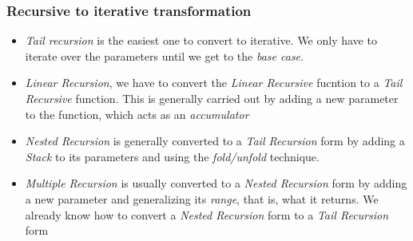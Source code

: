 \documentclass{beamer}
\begin{document}
\begin{frame}
	\frametitle{Recursive to iterative transformation}
	\begin{itemize}
		\item \textit{Tail recursion} is the easiest one to convert to iterative. We only have to iterate over the parameters until we get to the \textit{base case}.
		\item \textit{Linear Recursion}, we have to convert the \textit{Linear Recursive} fucntion to a \textit{Tail Recursive} function. This is generally carried out by adding a new parameter to the function, which acts as an \textit{accumulator}
		\item \textit{Nested Recursion} is generally converted to a \textit{Tail Recursion} form by adding a \textit{Stack} to its parameters and using the \textit{fold/unfold} technique.
		\item \textit{Multiple Recursion} is usually converted to a \textit{Nested Recursion} form by adding a new parameter and generalizing its \textit{range}, that is, what it returns. We already know how to convert a \textit{Nested Recursion} form to a \textit{Tail Recursion} form
	\end{itemize}
\end{frame}
\end{document}
